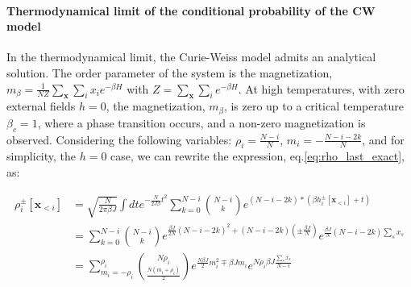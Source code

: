 \paragraph{Thermodynamical limit of the conditional probability of the CW model}
In the thermodynamical limit, the Curie-Weiss model admits an analytical solution. The order parameter of the system is the magnetization, $m_{\beta}=\frac{1}{N Z}\sum_{\mathbf{x}}\sum_i x_i e^{-\beta H}$ with $Z = \sum_{\mathbf{x}}\sum_i e^{-\beta H}$. At high temperatures, with zero external fields $h=0$, the magnetization, $m_{\beta}$, is zero up to a critical temperature $\beta_c=1$, where a phase transition occurs, and a non-zero magnetization is observed. Considering the following variables: $\rho_i = \frac{N-i}{N}$, $m_i = -\frac{N-i-2k}{N}$, and for simplicity, the $h=0$ case, we can rewrite the expression, eq.\ref{eq:rho_last_exact}, as:
\begin{widetext}
    \begin{align*}
    \rho_i^{\pm}[\mathbf{x}_{<i}] &= \sqrt{\frac{N}{2\pi \beta J}}\int dt e^{-\frac{N}{2J \beta}t^{2}} 
    \sum_{k=0}^{N-i} \binom{N-i}{k} e^{(N-i-2k)*(\beta h_i^{\pm}[\mathbf{x}_{<i}] + t)}\\
    &= \sum_{k=0}^{N-i} \binom{N-i}{k}e^{\frac{\beta J}{2N}\left(N-i-2k\right)^{2}+\left(N-i-2k\right)\left(\pm\frac{\beta J}{N}\right)} e^{\frac{\beta J}{N}\left(N-i-2k\right) \sum_s x_s} \\
    &= \sum_{m_i=-\rho_i}^{\rho_i} \binom{N\rho_i}{\frac{N(m_i+\rho_i)}{2}} e^{\frac{N \beta J}{2}m_i^{2} \mp \beta J m_i } e^{N \rho_i \beta J \frac{\sum_s x_s}{N-i}}
    \end{align*}    
\end{widetext}

